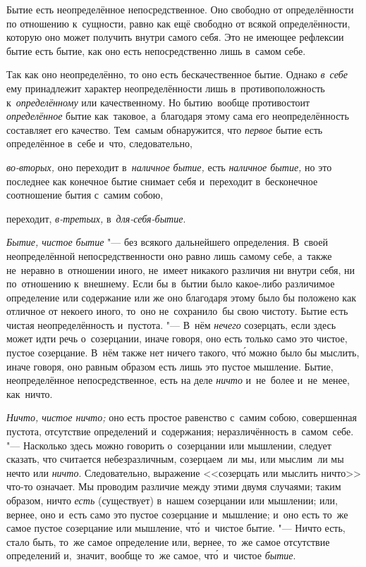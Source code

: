 Бытие есть неопределённое непосредственное. Оно свободно от определённости по
отношению к~сущности, равно как ещё свободно от всякой определённости, которую
оно может получить внутри самого себя. Это не имеющее рефлексии бытие есть
бытие, как оно есть непосредственно лишь в~самом себе.

Так как оно неопределённо, то оно есть бескачественное бытие. Однако
{\em в~себе} ему принадлежит характер неопределённости лишь в~противоположность
к~{\em определённому} или качественному. Но бытию~вообще противостоит
{\em определённое} бытие как~таковое, а~благодаря этому сама его
неопределённость составляет его качество. Тем~самым обнаружится, что
{\em первое} бытие есть определённое в~себе и~что, следовательно,

{\em во-вторых,} оно переходит в~{\em наличное бытие,} есть
{\em наличное бытие,} но это последнее как конечное бытие снимает себя
и~переходит в~бесконечное соотношение бытия с~самим собою,

переходит, {\em в-третьих,} в~{\em для-себя-бытие}.



{\em Бытие, чистое бытие} "--- без всякого дальнейшего определения.
В~своей неопределённой непосредственности оно равно лишь самому себе, а~также
не~неравно в~отношении иного, не~имеет никакого различия ни внутри себя, ни
по~отношению к~внешнему. Если бы в~бытии было какое-либо различимое определение
или содержание или же оно благодаря этому было бы положено как отличное от
некоего иного, то~оно не~сохранило~бы свою чистоту. Бытие есть чистая
неопределённость и~пустота. "--- В~нём {\em нечего} созерцать, если здесь может
идти речь о~созерцании, иначе говоря, оно есть только само это чистое, пустое
созерцание. В~нём также нет ничего такого, чт\'{о} можно было бы мыслить, иначе
говоря, оно равным образом есть лишь это пустое мышление. Бытие, неопределённое
непосредственное, есть на деле {\em ничто} и~не~более и~не~менее, как~ничто.


{\em Ничто, чистое ничто;} оно есть простое равенство с~самим собою,
совершенная пустота, отсутствие определений и~содержания; неразличённость
в~самом~себе. "--- Насколько здесь можно говорить о~созерцании или мышлении,
следует сказать, что считается небезразличным, созерцаем~ли мы, или мыслим~ли
мы нечто или {\em ничто}. Следовательно, выражение <<созерцать или мыслить ничто>>
что-то означает. Мы проводим различие между этими двумя
случаями; таким образом, ничто {\em есть} (существует) в~нашем созерцании или
мышлении; или, вернее, оно и~есть само это пустое созерцание и~мышление; и~оно
есть то~же самое пустое созерцание или мышление, чт\'{о}~и~чистое бытие. "---
Ничто есть, стало быть, то~же самое определение или, вернее, то~же самое
отсутствие определений и,~значит, вообще то~же самое,
чт\'{о}~и~чистое {\em бытие}.

